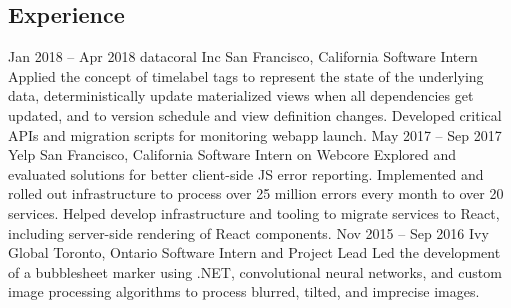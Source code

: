 \documentclass{resume}
\begin{document}
\begin{main}
    \section{Experience}
      \begin{entrylist}
        \rightentry%
          {Jan 2018 -- Apr 2018}%
          {datacoral Inc}%
          {San Francisco, California}%
          {Software Intern}%
          {%
          {%
            Applied the concept of timelabel tags to represent the state of the underlying data, %
            deterministically update materialized views when all dependencies get updated, and to %
            version schedule and view definition changes. %
          }%
          {%
            Developed critical APIs and migration scripts for monitoring webapp launch.
          }}
        \rightentry%
          {May 2017 -- Sep 2017}%
          {Yelp}%
          {San Francisco, California}%
          {Software Intern on Webcore}%
          {%
          {%
            Explored and evaluated solutions for better client-side JS error reporting. %
          }%
          {%
            Implemented and rolled out infrastructure to process over 25 million errors every %
            month to over 20 services. %
          }%
          {%
            Helped develop infrastructure and tooling to migrate services to React, including %
            server-side rendering of React components. %
          }}
        \rightentry%
          {Nov 2015 -- Sep 2016}%
          {Ivy Global}%
          {Toronto, Ontario}%
          {Software Intern and Project Lead}%
          {%
          {%
            Led the development of a bubblesheet marker using .NET, convolutional neural %
            networks, and custom image processing algorithms to process blurred, tilted, and %
            imprecise images. %
          }}
      \end{entrylist}

\end{main}
\end{document}
